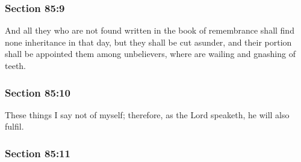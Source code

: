 
	\subsubsection{Section 85:9} %
		\label{DC85-9}

		And all they who are not found written in the book of remembrance shall find none inheritance in that day, but they shall be cut asunder, and their portion shall be appointed them among unbelievers, where are wailing and gnashing of teeth.


	\subsubsection{Section 85:10} %
		\label{DC85-10}

		These things I say not of myself; therefore, as the Lord speaketh, he will also fulfil.


	\subsubsection{Section 85:11} %
		\label{DC85-11}

